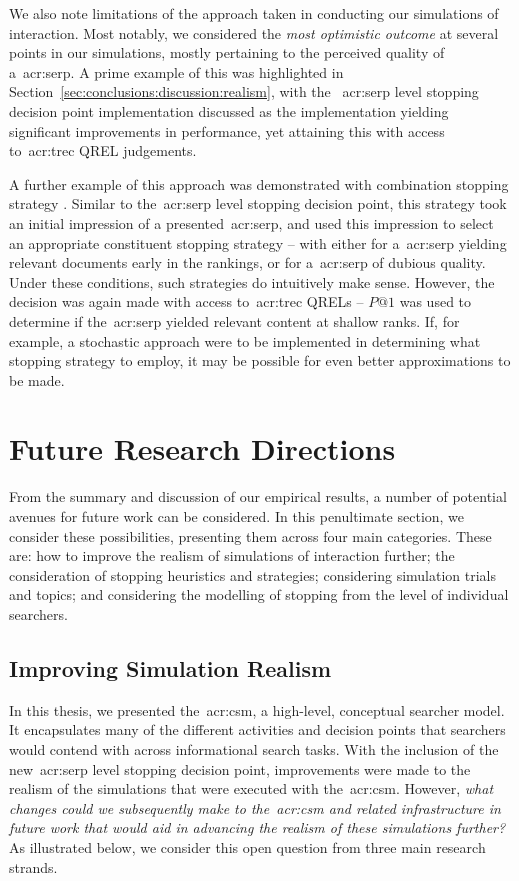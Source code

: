 We also note limitations of the approach taken in conducting our simulations of interaction. Most notably, we considered the \emph{most optimistic outcome} at several points in our simulations, mostly pertaining to the perceived quality of a~\gls{acr:serp}. A prime example of this was highlighted in Section~\ref{sec:conclusions:discussion:realism}, with the ~\gls{acr:serp} level stopping decision point implementation discussed as the implementation yielding significant improvements in performance, yet attaining this with access to~\gls{acr:trec} QREL judgements.

A further example of this approach was demonstrated with combination stopping strategy . Similar to the~\gls{acr:serp} level stopping decision point, this strategy took an initial impression of a presented~\gls{acr:serp}, and used this impression to select an appropriate constituent stopping strategy -- with either  for a~\gls{acr:serp} yielding relevant documents early in the rankings, or  for a~\gls{acr:serp} of dubious quality. Under these conditions, such strategies do intuitively make sense. However, the decision was again made with access to~\gls{acr:trec} QRELs -- $P@1$ was used to determine if the~\gls{acr:serp} yielded relevant content at shallow ranks. If, for example, a stochastic approach were to be implemented in determining what stopping strategy to employ, it may be possible for even better approximations to be made.

\section{Future Research Directions}\label{sec:conclusions:future}
From the summary and discussion of our empirical results, a number of potential avenues for future work can be considered. In this penultimate section, we consider these possibilities, presenting them across four main categories. These are: how to improve the realism of simulations of interaction further; the consideration of stopping heuristics and strategies; considering simulation trials and topics; and considering the modelling of stopping from the level of individual searchers.

\subsection{Improving Simulation Realism}\label{sec:conclusions:future:improving}
In this thesis, we presented the~\gls{acr:csm}, a high-level, conceptual searcher model. It encapsulates many of the different activities and decision points that searchers would contend with across informational search tasks. With the inclusion of the new~\gls{acr:serp} level stopping decision point, improvements were made to the realism of the simulations that were executed with the~\gls{acr:csm}. However, \emph{what changes could we subsequently make to the~\gls{acr:csm} and related infrastructure in future work that would aid in advancing the realism of these simulations further?} As illustrated below, we consider this open question from three main research strands.

